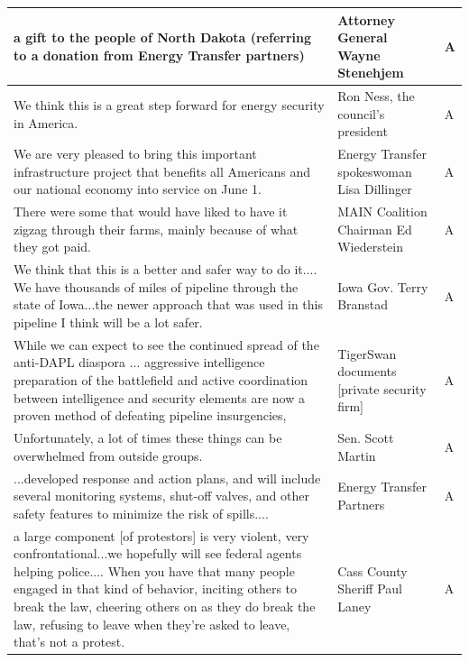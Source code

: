 \begin{footnotesize}
\begin{spacing}{1}
\begin{longtable}{| p{} | P{.25\textwidth} | p{.07\textwidth}|}
a gift to the people of North Dakota (referring to a donation from Energy Transfer partners)        & Attorney General Wayne Stenehjem             & A              \\ \hline
We think this is a great step forward for energy security in America.                               & Ron Ness, the council's president            & A              \\ \hline
We are very pleased to bring this important infrastructure project that benefits all Americans and our national economy into service on June 1.                       & Energy Transfer spokeswoman Lisa Dillinger   & A              \\ \hline
There were some that would have liked to have it zigzag through their farms, mainly because of what they got paid.                                                    & MAIN Coalition Chairman Ed Wiederstein       & A              \\ \hline
We think that this is a better and safer way to do it.... We have thousands of miles of pipeline through the state of Iowa...the newer approach that was used in this pipeline I think will be a lot safer.                                                   & Iowa Gov. Terry Branstad                     & A              \\ \hline
While we can expect to see the continued spread of the anti-DAPL diaspora ... aggressive intelligence preparation of the battlefield and active coordination between intelligence and security elements are now a proven method of defeating pipeline insurgencies,                                                           & TigerSwan documents [private security firm]  & A              \\ \hline
Unfortunately, a lot of times these things can be overwhelmed from outside groups.                  & Sen. Scott Martin                            & A              \\ \hline
...developed response and action plans, and will include several monitoring systems, shut-off valves, and other safety features to minimize the risk of spills....     & Energy Transfer Partners                     & A              \\ \hline
a large component [of protestors] is very violent, very confrontational...we hopefully will see federal agents helping police.... When you have that many people engaged in that kind of behavior, inciting others to break the law, cheering others on as they do break the law, refusing to leave when they're asked to leave, that's not a protest.                                                              & Cass County Sheriff Paul Laney               & A              \\ \hline

\end{longtable}
\end{spacing}
\end{footnotesize}
